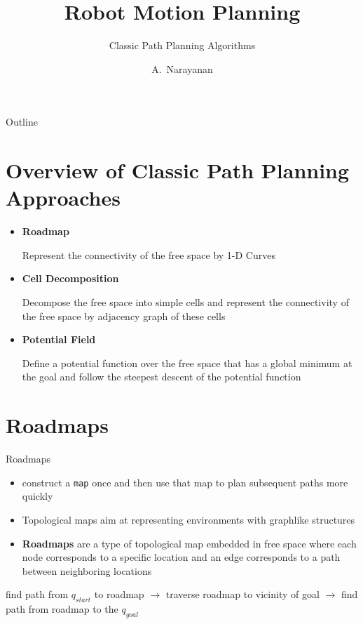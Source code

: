 \documentclass[handout]{beamer}
\title[RMP v\var{version}]
{Robot Motion Planning}
\subtitle
{Classic Path Planning Algorithms}
\author[Narayanan]
{A.~Narayanan\inst{1}}
\institute[Technical University of Munich]
{
  \inst{1}
  Department of Informatics\\
}
\date{}
\begin{document}
\begin{frame}
    \titlepage
  \end{frame}
  
  \begin{frame}{Outline}
    \tableofcontents
  \end{frame}

  \section{Overview of Classic Path Planning Approaches}

  \begin{frame}
    \begin{itemize}
        \item \textbf{Roadmap} \pause

        Represent the connectivity of the free space by 1-D Curves \pause

        \item \textbf{Cell Decomposition} \pause

        Decompose the free space into simple cells and represent the connectivity of the free space by adjacency graph of these cells \pause

        \item \textbf{Potential Field} \pause

        Define a potential function over the free space that has a global minimum at the goal and follow the steepest descent of the potential function
    \end{itemize}
  \end{frame}

  \section[Roadmaps]{Roadmaps}

  \begin{frame}{Roadmaps}
    \begin{itemize}
      \item construct a \texttt{map} once and then use that map to plan subsequent paths more quickly \pause
      \item Topological maps aim at representing environments with graphlike structures \pause
      \item \textbf{Roadmaps} are a type of topological map embedded in free space where each node corresponds to a specific location and an edge corresponds to a path between neighboring locations \pause
    \end{itemize}
  
    

    \centering
    find path from $q_{start}$ to roadmap $\rightarrow$ \pause traverse roadmap to vicinity of goal $\rightarrow$  \pause find path from roadmap to the $q_{goal}$
  
  \end{frame}
\end{document}
